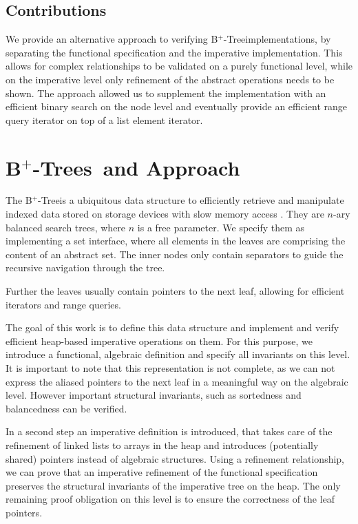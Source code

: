 \documentclass[a4paper,UKenglish,cleveref, autoref, thm-restate]{lipics-v2021}
\newcommand{\btree}{B$^+$-Tree}
\newcommand{\btrees}{B$^+$-Trees}
\begin{document}
\subsection{Contributions}
\label{sec:contributions}

We provide an alternative approach to verifying \btree implementations,
by separating the functional specification and the imperative implementation.
This allows for complex relationships to be validated on a purely
functional level, while on the imperative level
only refinement of the abstract operations needs to be shown.
The approach allowed us to supplement the implementation
with an efficient binary search on the node level
and eventually provide an efficient range query iterator
on top of a list element iterator.


\section{\btrees\ and Approach}
\label{sec:approach}

The \btree is a ubiquitous data structure to efficiently retrieve and manipulate
indexed data stored on storage devices with slow memory access \cite{DBLP:journals/csur/Comer79}.
They are $n$-ary balanced search trees, where $n$ is a free parameter.
We specify them as implementing a set interface,
where all elements in the leaves are comprising the content of an abstract set.
The inner nodes only contain separators to guide the recursive navigation through the tree.

Further the leaves usually contain pointers
to the next leaf, allowing for efficient iterators and range queries.

The goal of this work is to define this data structure
and implement and verify efficient heap-based imperative operations on them.
For this purpose, we introduce a functional, algebraic definition and
specify all invariants on this level.
It is important to note that this representation is not complete,
as we can not express the aliased pointers to the next leaf in a meaningful
way on the algebraic level.
However important structural invariants, such as sortedness and balancedness
can be verified.

In a second step an imperative definition is introduced,
that takes care of the refinement of linked lists to arrays in the heap
and introduces (potentially shared) pointers instead of algebraic structures.
Using a refinement relationship, we can prove that an imperative refinement
of the functional specification preserves the structural invariants
of the imperative tree on the heap.
The only remaining proof obligation on this level is to ensure the correctness
of the leaf pointers.
\end{document}
